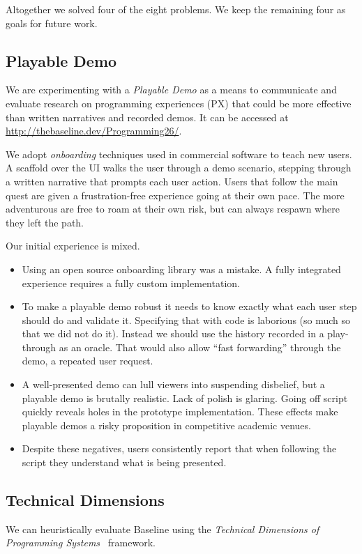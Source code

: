 \documentclass[english,submission]{programming}
\theoremstyle{definition}
\begin{document}
Altogether we solved four of the eight problems. We keep the remaining four as goals for future work.


\subsection{Playable Demo}\label{demo}

We are experimenting with a \textit{Playable Demo} as a means to communicate and evaluate research on programming experiences (PX) that could be more effective than written narratives and recorded demos.
It can be accessed at \url{http://thebaseline.dev/Programming26/}.

We adopt \textit{onboarding} techniques used in commercial software to teach new users. A scaffold over the UI walks the user through a demo scenario, stepping through a written narrative that prompts each user action. Users that follow the main quest are given a frustration-free experience going at their own pace. The more adventurous are free to roam at their own risk, but can always respawn where they left the path.

Our initial experience is mixed.

\begin{itemize}
\item Using an open source onboarding library was a mistake. A fully integrated experience requires a fully custom implementation.
\item To make a playable demo robust it needs to know exactly what each user step should do and validate it. Specifying that with code is laborious (so much so that we did not do it). Instead we should use the history recorded in a play-through as an oracle. That would also allow ``fast forwarding'' through the demo, a repeated user request.
\item A well-presented demo can lull viewers into suspending disbelief, but a playable demo is brutally realistic. Lack of polish is glaring. Going off script quickly reveals holes in the prototype implementation. These effects make playable demos a risky proposition in competitive academic venues.
\item Despite these negatives, users consistently report that when following the script they understand what is being presented.

\end{itemize}


\subsection{Technical Dimensions}
We can heuristically evaluate Baseline using the \textit{Technical Dimensions of Programming Systems}~\cite{techdims} framework.
\end{document}
